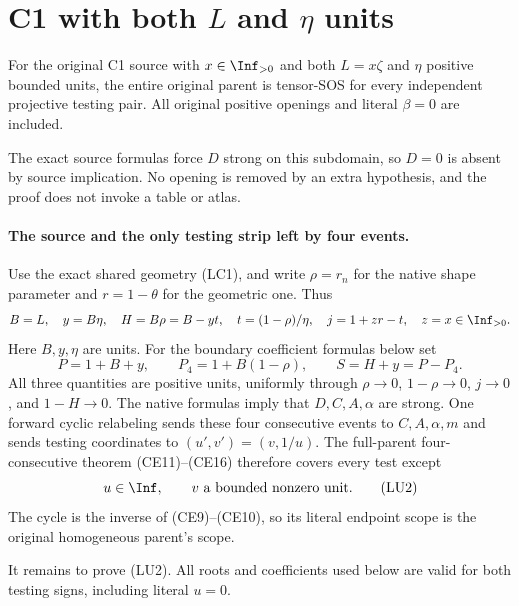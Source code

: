 \section{\texorpdfstring{C1 with both $L$ and $\eta$ units}{C1 with both L and eta units}}
\label{component:p686209b87229}

\label{p686209b87229:sec:r7-c1-L-eta-unit}

\begin{theorem}
For the original C1 source with $x\in\Inf_{>0}$ and both
$L=x\zeta$ and $\eta$ positive bounded units, the entire original
parent is tensor-SOS for every independent projective testing pair.
All original positive openings and literal $\beta=0$ are included.
\end{theorem}

The exact source formulas force $D$ strong on this subdomain, so
$D=0$ is absent by source implication.  No opening is removed by
an extra hypothesis, and the proof does not invoke a table or atlas.

\paragraph{The source and the only testing strip left by four events.}
Use the exact shared geometry (LC1), and write $\rho=r_n$ for the
native shape parameter and $r=1-\theta$ for the geometric one.
Thus
\[
 B=L,\quad y=B\eta,\quad H=B\rho=B-yt,\quad
 t=(1-\rho)/\eta,\quad j=1+zr-t,
 \quad z=x\in\Inf_{>0}.
\]
Here $B,y,\eta$ are units.  For the boundary coefficient formulas
below set
\[
 P=1+B+y,\qquad P_4=1+B(1-\rho),\qquad S=H+y=P-P_4.
                                                               \tag{LU1}
\]
All three quantities are positive units, uniformly through
$\rho\to0$, $1-\rho\to0$, $j\to0$, and $1-H\to0$.
The native formulas imply that $D,C,A,\alpha$ are strong.
One forward cyclic relabeling sends these four consecutive events
to $C,A,\alpha,m$ and sends testing coordinates to
$(u',v')=(v,1/u)$.  The full-parent four-consecutive theorem
(CE11)--(CE16) therefore covers every test except
\[
                    u\in\Inf,\qquad v\text{ a bounded nonzero unit}.
                                                               \tag{LU2}
\]
The cycle is the inverse of (CE9)--(CE10), so its literal endpoint
scope is the original homogeneous parent's scope.

It remains to prove (LU2).  All roots and coefficients used below
are valid for both testing signs, including literal $u=0$.

